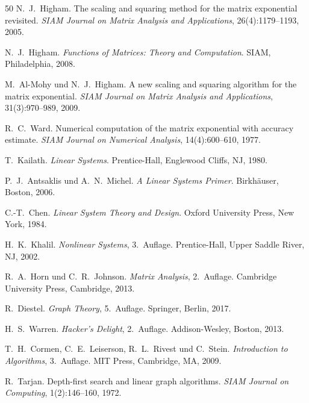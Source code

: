 \documentclass[a4paper,12pt]{report}
\theoremstyle{definition}
\begin{document}
\begin{thebibliography}{50}
N.~J.~Higham.
\newblock The scaling and squaring method for the matrix exponential revisited.
\newblock \textit{SIAM Journal on Matrix Analysis and Applications}, 26(4):1179--1193, 2005.

N.~J.~Higham.
\newblock \textit{Functions of Matrices: Theory and Computation}.
\newblock SIAM, Philadelphia, 2008.

M.~Al-Mohy und N.~J.~Higham.
\newblock A new scaling and squaring algorithm for the matrix exponential.
\newblock \textit{SIAM Journal on Matrix Analysis and Applications}, 31(3):970--989, 2009.

R.~C.~Ward.
\newblock Numerical computation of the matrix exponential with accuracy estimate.
\newblock \textit{SIAM Journal on Numerical Analysis}, 14(4):600--610, 1977.

T.~Kailath.
\newblock \textit{Linear Systems}.
\newblock Prentice-Hall, Englewood Cliffs, NJ, 1980.

P.~J.~Antsaklis und A.~N.~Michel.
\newblock \textit{A Linear Systems Primer}.
\newblock Birkhäuser, Boston, 2006.

C.-T.~Chen.
\newblock \textit{Linear System Theory and Design}.
\newblock Oxford University Press, New York, 1984.

H.~K.~Khalil.
\newblock \textit{Nonlinear Systems}, 3.~Auflage.
\newblock Prentice-Hall, Upper Saddle River, NJ, 2002.

R.~A.~Horn und C.~R.~Johnson.
\newblock \textit{Matrix Analysis}, 2.~Auflage.
\newblock Cambridge University Press, Cambridge, 2013.

R.~Diestel.
\newblock \textit{Graph Theory}, 5.~Auflage.
\newblock Springer, Berlin, 2017.

H.~S.~Warren.
\newblock \textit{Hacker's Delight}, 2.~Auflage.
\newblock Addison-Wesley, Boston, 2013.

T.~H.~Cormen, C.~E.~Leiserson, R.~L.~Rivest und C.~Stein.
\newblock \textit{Introduction to Algorithms}, 3.~Auflage.
\newblock MIT Press, Cambridge, MA, 2009.

R.~Tarjan.
\newblock Depth-first search and linear graph algorithms.
\newblock \textit{SIAM Journal on Computing}, 1(2):146--160, 1972.


\end{thebibliography}
\end{document}
